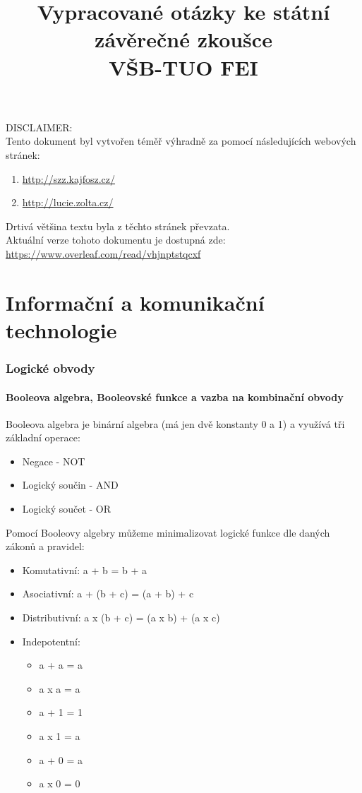 \documentclass[10pt,a4paper]{article}
\author{}
\title{Vypracované otázky ke státní závěrečné zkoušce \\VŠB-TUO FEI}
\begin{document}
\maketitle
\begin{center}
\large{DISCLAIMER:}\\
Tento dokument byl vytvořen téměř výhradně za pomocí následujících webových stránek: 
\begin{enumerate}
\centering
\item \url{http://szz.kajfosz.cz/}
\item \url{http://lucie.zolta.cz/}
\end{enumerate}
Drtivá většina textu byla z těchto stránek převzata.\\
Aktuální verze tohoto dokumentu je dostupná zde:\\ \url{https://www.overleaf.com/read/vhjnptstqcxf}
\end{center}
\newpage
\tableofcontents
\newpage
\part{Informační a komunikační technologie}
\newpage
\section{Logické obvody}
\subsection{Booleova algebra, Booleovské funkce a vazba na kombinační obvody}
Booleova algebra je binární algebra (má jen dvě konstanty 0 a 1) a využívá tři základní operace:
\begin{itemize}
\item Negace - NOT
\item Logický součin - AND
\item Logický součet - OR
\end{itemize}
Pomocí Booleovy algebry můžeme minimalizovat logické funkce dle daných zákonů a pravidel:

\begin{itemize}
\item Komutativní: a + b = b + a
\item Asociativní: a + (b + c) = (a + b) + c
\item Distributivní: a x (b + c) = (a x b) + (a x c)
\item Indepotentní:
\begin{itemize}
\item a + a = a
\item a x a = a
\item a + 1 = 1
\item a x 1 = a
\item a + 0 = a
\item a x 0 = 0
\end{itemize}

\end{itemize}
\end{document}
